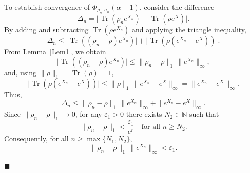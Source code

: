 \documentclass[10pt,a4paper]{amsart}
\renewenvironment{proof}{\noindent{\bfseries Proof.}}{\hfill$\blacksquare$}
\begin{document}
\begin{proof}
To establish convergence of $\Phi_{\rho_n,\sigma_n}(\alpha-1)$,
consider the difference
\begin{equation}
    \Delta_n =
    \big|
    \operatorname{Tr}(\rho_n e^{X_n})
    -
    \operatorname{Tr}(\rho e^{X})
    \big|.
\end{equation}
By adding and subtracting $\operatorname{Tr}(\rho e^{X_n})$ and applying the
triangle inequality,
\begin{equation}
    \Delta_n \le \big|\operatorname{Tr}((\rho_n-\rho)e^{X_n})\big|+
    \big|\operatorname{Tr}(\rho(e^{X_n}-e^{X}))\big|.
\end{equation}
From Lemma~\ref{Lem1}, we obtain 
\begin{equation}
    \big|\operatorname{Tr}((\rho_n-\rho)e^{X_n})\big|\le\|\rho_n-\rho\|_1 \, \|e^{X_n}\|_\infty,
\end{equation}
and, using $\|\rho\|_1 = \operatorname{Tr}(\rho) = 1$,
\begin{equation}
    \big|\operatorname{Tr}(\rho(e^{X_n}-e^{X}))\big|\le
    \|\rho\|_1 \, \|e^{X_n}-e^{X}\|_{\infty} = \|e^{X_n}-e^{X}\|_{\infty}.
\end{equation}
Thus, 
\begin{equation}
    \Delta_n\le \|\rho_n-\rho\|_1 \, \|e^{X_n}\|_{\infty}
    + \|e^{X_n}-e^{X}\|_{\infty}.
\end{equation}
Since $\|\rho_n-\rho\|_1 \to 0$, for any $\varepsilon_1>0$ there exists $N_2\in\mathbb{N}$ 
such that
\begin{equation}
    \|\rho_n-\rho\|_1 < \frac{\varepsilon_1}{e^{r}}
    \quad \text{for all } n\ge N_2.
\end{equation}
Consequently, for all $n\ge \max\{N_1,N_2\}$,
\begin{equation}
    \|\rho_n-\rho\|_1\,\|e^{X_n}\|_{\infty} < \varepsilon_1.
\end{equation}    


\end{proof}
\end{document}

